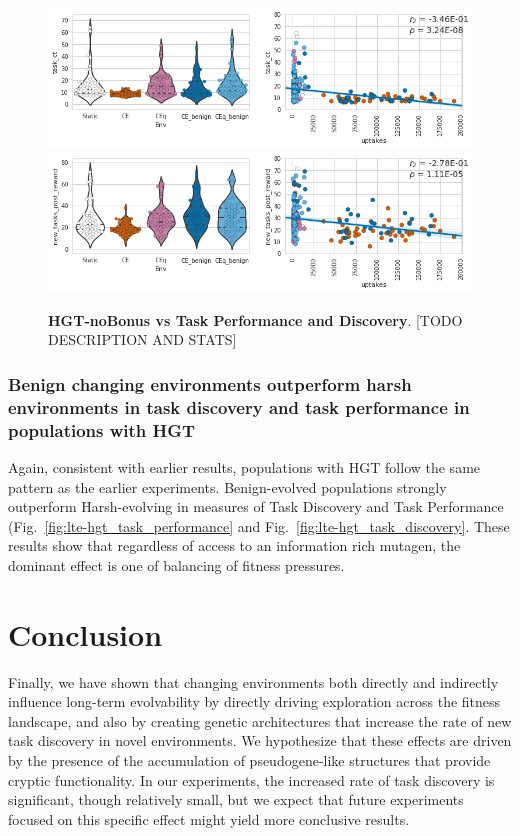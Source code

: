 \documentclass[PhD]{msu-thesis}
\begin{document}
	\begin{figure}[!h]
	\includegraphics[trim={0 0 0 0}, clip, width=0.75\columnwidth]{figures/LTE/lte-no-bonus_hgt_vs_task_performance.png}
	\includegraphics[trim={0 0 0 0}, clip, width=0.75\columnwidth]{figures/LTE/lte-no-bonus_hgt_vs_task_discovery.png}
	\caption{\textbf{HGT-noBonus vs Task Performance and Discovery}. [TODO DESCRIPTION AND STATS]%
	}
	\label{fig:lte-no-bonus_hgt_vs_task_performance}
	\end{figure}	

\subsubsection{Benign changing environments outperform harsh environments in task discovery and task performance in populations with HGT}
Again, consistent with earlier results, populations with HGT follow the same pattern as the earlier experiments. Benign-evolved populations strongly outperform Harsh-evolving in measures of Task Discovery and Task Performance (Fig.~\ref{fig:lte-hgt_task_performance} and Fig.~\ref{fig:lte-hgt_task_discovery}. These results show that regardless of access to an information rich mutagen, the dominant effect is one of balancing of fitness pressures. 



\section{Conclusion}

Finally, we have shown that changing environments both directly and indirectly influence long-term evolvability by directly driving exploration across the fitness landscape, and also by creating genetic architectures that increase the rate of new task discovery in novel environments. We hypothesize that these effects are driven by the presence of the accumulation of pseudogene-like structures that provide cryptic functionality. In our experiments, the increased rate of task discovery is significant, though relatively small, but we expect that future experiments focused on this specific effect might yield more conclusive results. 
\end{document}
